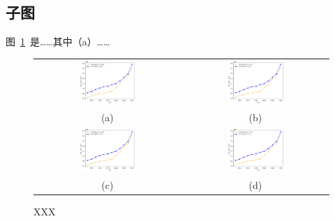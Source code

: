 \documentclass[14pt]{jnuthesis}
\begin{document}
\subsection{子图}

图~\ref{fig:trend}~是……其中（a）……

\begin{figure}[htbp]
	\centering
	\begin{tabular}{cc}
		\centerline{\includegraphics[width=0.4\textwidth]{figs/trends/trend_a.png}} & 
		\centerline{\includegraphics[width=0.4\textwidth]{figs/trends/trend_b.png}}  \\
		\centerline{(a)} & \centerline{(b)}  \\
		\centerline{\includegraphics[width=0.4\textwidth]{figs/trends/trend_c.png}} & 
		\centerline{\includegraphics[width=0.4\textwidth]{figs/trends/trend_d.png}}  \\
		\centerline{(c)} & \centerline{(d)}  \\
	\end{tabular}
	\caption{XXX} %
	\label{fig:trend} %
\end{figure}
\end{document}

